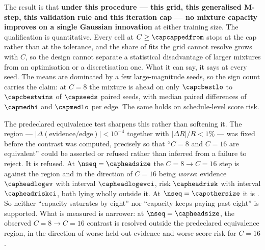 \noindent The result is that \textbf{under this procedure --- this grid, this
generalised M-step, this validation rule and this iteration cap --- no mixture
capacity improves on a single Gaussian innovation} at either training size. The
qualification is quantitative. Every cell at $C \geq \capcappedfrom$ stops at
the cap rather than at the tolerance, and the share of fits the grid cannot
resolve grows with $C$, so the design cannot separate a statistical
disadvantage of larger mixtures from an optimisation or a discretisation one.
What it can say, it says at every seed. The means are dominated by a few
large-magnitude seeds, so the sign count carries the claim: at $C=8$ the mixture
is ahead on only $\capcbestlo$ to $\capcbestwins$ of $\capseeds$ paired seeds,
with median paired differences of $\capmedhi$ and $\capmedlo$ per edge. The
same holds on schedule-level score risk.

The predeclared equivalence test sharpens this rather than softening it. The
region --- $|\Delta(\text{evidence/edge})| < 10^{-4}$ together with
$|\Delta R|/R < 1\%$ --- was fixed before the contrast was computed, precisely so
that ``$C=8$ and $C=16$ are equivalent'' could be asserted or refused rather
than inferred from a failure to reject. It is refused. At
$\nseq = \capheadsize$ the $C=8 \to C=16$ step is \capheadverdict{} against the
region and in the direction of $C=16$ being \emph{worse}: evidence
$\capheadlogev$ with interval $\capheadlogevci$, risk $\capheadrisk$ with
interval $\capheadriskci$, both lying wholly outside it. At
$\nseq = \capothersize$ it is \capotherverdict. So neither ``capacity saturates
by eight'' nor ``capacity keeps paying past eight'' is supported. What is
measured is narrower: at $\nseq = \capheadsize$, the observed $C=8 \to C=16$
contrast is resolved outside the predeclared equivalence region, in the
direction of worse held-out evidence and worse score risk for $C=16$.


